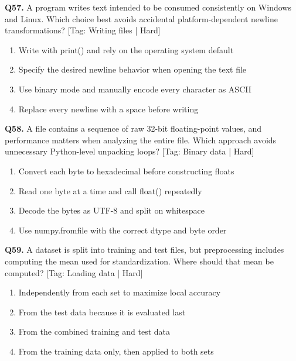 \vspace{2mm}
\noindent\textbf{Q57.} A program writes text intended to be consumed consistently on Windows and Linux. Which choice best avoids accidental platform-dependent newline transformations? \hfill [Tag: Writing files | Hard]
\begin{enumerate}[label=(\alph*),topsep=2pt,itemsep=1pt,partopsep=0pt,parsep=0pt]
    \item {Write with print() and rely on the operating system default}
    \item {Specify the desired newline behavior when opening the text file}
    \item {Use binary mode and manually encode every character as ASCII}
    \item {Replace every newline with a space before writing}
\end{enumerate}
\vspace{2mm}
\noindent\textbf{Q58.} A file contains a sequence of raw 32-bit floating-point values, and performance matters when analyzing the entire file. Which approach avoids unnecessary Python-level unpacking loops? \hfill [Tag: Binary data | Hard]
\begin{enumerate}[label=(\alph*),topsep=2pt,itemsep=1pt,partopsep=0pt,parsep=0pt]
    \item {Convert each byte to hexadecimal before constructing floats}
    \item {Read one byte at a time and call float() repeatedly}
    \item {Decode the bytes as UTF-8 and split on whitespace}
    \item {Use numpy.fromfile with the correct dtype and byte order}
\end{enumerate}
\vspace{2mm}
\noindent\textbf{Q59.} A dataset is split into training and test files, but preprocessing includes computing the mean used for standardization. Where should that mean be computed? \hfill [Tag: Loading data | Hard]
\begin{enumerate}[label=(\alph*),topsep=2pt,itemsep=1pt,partopsep=0pt,parsep=0pt]
    \item {Independently from each set to maximize local accuracy}
    \item {From the test data because it is evaluated last}
    \item {From the combined training and test data}
    \item {From the training data only, then applied to both sets}
\end{enumerate}
